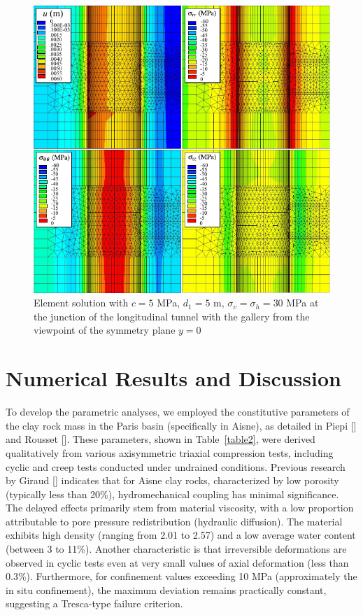 \documentclass[a4paper,fleqn]{cas-sc}
\begin{document}
\begin{figure}[h!]
	\centering
	\includegraphics[scale=1]{MA_FIG2.pdf}
	\caption{Element solution with $c=5$ MPa, $d_1=5$ m, $\sigma_v = \sigma_h = 30$ MPa at the junction of the longitudinal tunnel with the gallery from the viewpoint of the symmetry plane $y = 0$}
	\label{MA_FIG2}
\end{figure}
\FloatBarrier

\section{Numerical Results and Discussion}\label{}


To develop the parametric analyses, we employed the constitutive parameters of the clay rock mass in the Paris basin (specifically in Aisne), as detailed in Piepi [] and Rousset []. These parameters, shown in Table~\ref{table2}, were derived qualitatively from various axisymmetric triaxial compression tests, including cyclic and creep tests conducted under undrained conditions. Previous research by Giraud [] indicates that for Aisne clay rocks, characterized by low porosity (typically less than 20\%), hydromechanical coupling has minimal significance. The delayed effects primarily stem from material viscosity, with a low proportion attributable to pore pressure redistribution (hydraulic diffusion). The material exhibits high density (ranging from 2.01 to 2.57) and a low average water content (between 3 to 11\%). Another characteristic is that irreversible deformations are observed in cyclic tests even at very small values of axial deformation (less than 0.3\%). Furthermore, for confinement values exceeding 10 MPa (approximately the in situ confinement), the maximum deviation remains practically constant, suggesting a Tresca-type failure criterion.
\end{document}
